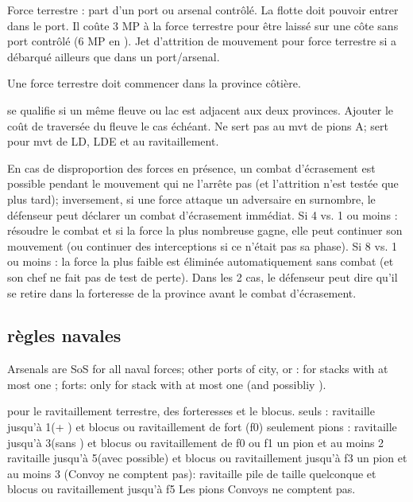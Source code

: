  Force terrestre : part d'un port ou arsenal
contrôlé.  La flotte doit pouvoir entrer dans le port.
\bparag Il coûte 3 MP à la force terrestre pour être laissé sur une côte
sans port contrôlé (6 MP en \ROTW).
\bparag Jet d'attrition de mouvement pour force terrestre si a débarqué 
ailleurs que dans un port/arsenal.

Une force terrestre doit commencer dans la province côtière. 

se qualifie si un même fleuve ou lac est adjacent
aux deux provinces. Ajouter le coût de traversée du
fleuve le cas échéant.
\bparag Ne sert pas au mvt de pions A; sert pour mvt de LD, LDE
et au ravitaillement. 

En cas de disproportion des forces en présence, un combat d'écrasement est possible
pendant le mouvement qui ne l'arrête pas (et l'attrition n'est testée que plus tard);
inversement, si une force attaque un adversaire en surnombre, le défenseur
peut déclarer un combat d'écrasement immédiat.
\bparag Si 4 \LD vs. 1 \LD ou moins :  résoudre le combat et si la force la
plus nombreuse gagne, elle peut continuer son mouvement (ou continuer des
interceptions si ce n'était pas sa phase).
\bparag Si 8 \LD vs. 1 \LD ou moins : la force la plus faible est éliminée automatiquement
sans combat (et son chef ne fait pas de test de perte).
\bparag Dans les 2 cas, le défenseur peut dire qu'il se retire dans la forteresse
de la province avant le combat d'écrasement.


\subsection{règles navales}

Arsenals are SoS for all naval forces; other ports of city, \COL or \TP: for 
stacks with at most one \FLEET; forts: only for stack with at most one \ND 
(and possibliy \NDE).

 pour le ravitaillement terrestre, des
forteresses et le blocus.
\bparag \de seuls : ravitaille jusqu'à 1\DT (+ \LDE) et blocus ou ravitaillement de fort (f0) seulement
\bparag pions \DN : ravitaille jusqu'à 3\DT (sans \ARMY) et blocus ou ravitaillement de f0 ou f1
\bparag un pion \FLEET et au moins 2 \ND ravitaille jusqu'à 5\DT (avec \ARMY possible) et blocus ou ravitaillement jusqu'à f3
\bparag un pion \FLEET\faceplus et au moins 3 \ND (Convoy ne comptent pas): ravitaille pile
de taille quelconque et blocus ou ravitaillement jusqu'à f5
\bparag Les pions Convoys ne comptent pas.

